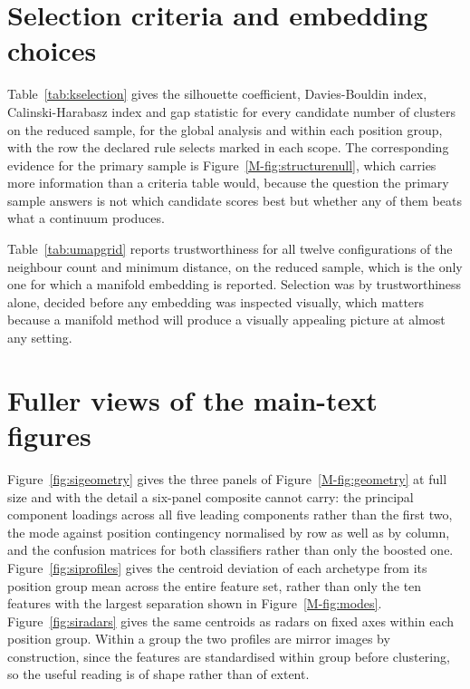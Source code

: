 \section{Selection criteria and embedding choices}
\label{sec:si:selection}

Table~\ref{tab:kselection} gives the silhouette coefficient, Davies-Bouldin index,
Calinski-Harabasz index and gap statistic for every candidate number of clusters on the reduced
sample, for the global analysis and within each position group, with the row the declared rule
selects marked in each scope. The corresponding evidence for the primary sample is
Figure~\ref{M-fig:structurenull}, which carries more information than a criteria table would,
because the question the primary sample answers is not which candidate scores best but whether
any of them beats what a continuum produces.

Table~\ref{tab:umapgrid} reports trustworthiness for all twelve configurations of the neighbour
count and minimum distance, on the reduced sample, which is the only one for which a manifold
embedding is reported. Selection was by trustworthiness alone, decided before any embedding was
inspected visually, which matters because a manifold method will produce a visually appealing
picture at almost any setting.





\section{Fuller views of the main-text figures}
\label{sec:si:profiles}

Figure~\ref{fig:sigeometry} gives the three panels of Figure~\ref{M-fig:geometry} at full size and
with the detail a six-panel composite cannot carry: the principal component loadings across all
five leading components rather than the first two, the mode against position contingency
normalised by row as well as by column, and the confusion matrices for both classifiers rather
than only the boosted one. Figure~\ref{fig:siprofiles} gives the centroid deviation of each archetype from its position
group mean across the entire feature set, rather than only the ten features with the largest
separation shown in Figure~\ref{M-fig:modes}. Figure~\ref{fig:siradars} gives the same centroids
as radars on fixed axes within each position group. Within a group the two profiles are mirror
images by construction, since the features are standardised within group before clustering, so
the useful reading is of shape rather than of extent.

